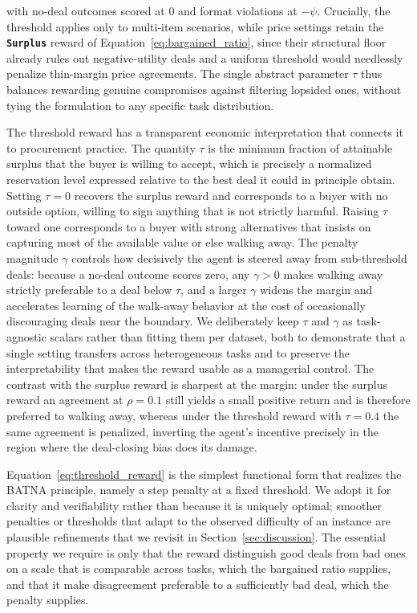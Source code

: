 \documentclass{interact}
\theoremstyle{plain}
\theoremstyle{definition}
\theoremstyle{remark}
\newcommand{\Surplus}{\textbf{\texttt{Surplus}}\xspace}
\begin{document}
with no-deal outcomes scored at $0$ and format violations at $-\psi$. Crucially, the threshold applies only to multi-item scenarios, while price settings retain the \Surplus reward of Equation~\eqref{eq:bargained_ratio}, since their structural floor already rules out negative-utility deals and a uniform threshold would needlessly penalize thin-margin price agreements. The single abstract parameter $\tau$ thus balances rewarding genuine compromises against filtering lopsided ones, without tying the formulation to any specific task distribution.

The threshold reward has a transparent economic interpretation that connects it to procurement practice. The quantity $\tau$ is the minimum fraction of attainable surplus that the buyer is willing to accept, which is precisely a normalized reservation level expressed relative to the best deal it could in principle obtain. Setting $\tau = 0$ recovers the surplus reward and corresponds to a buyer with no outside option, willing to sign anything that is not strictly harmful. Raising $\tau$ toward one corresponds to a buyer with strong alternatives that insists on capturing most of the available value or else walking away. The penalty magnitude $\gamma$ controls how decisively the agent is steered away from sub-threshold deals: because a no-deal outcome scores zero, any $\gamma > 0$ makes walking away strictly preferable to a deal below $\tau$, and a larger $\gamma$ widens the margin and accelerates learning of the walk-away behavior at the cost of occasionally discouraging deals near the boundary. We deliberately keep $\tau$ and $\gamma$ as task-agnostic scalars rather than fitting them per dataset, both to demonstrate that a single setting transfers across heterogeneous tasks and to preserve the interpretability that makes the reward usable as a managerial control. The contrast with the surplus reward is sharpest at the margin: under the surplus reward an agreement at $\rho = 0.1$ still yields a small positive return and is therefore preferred to walking away, whereas under the threshold reward with $\tau = 0.4$ the same agreement is penalized, inverting the agent's incentive precisely in the region where the deal-closing bias does its damage.

Equation~\eqref{eq:threshold_reward} is the simplest functional form that realizes the BATNA principle, namely a step penalty at a fixed threshold. We adopt it for clarity and verifiability rather than because it is uniquely optimal; smoother penalties or thresholds that adapt to the observed difficulty of an instance are plausible refinements that we revisit in Section~\ref{sec:discussion}. The essential property we require is only that the reward distinguish good deals from bad ones on a scale that is comparable across tasks, which the bargained ratio supplies, and that it make disagreement preferable to a sufficiently bad deal, which the penalty supplies.
\end{document}
